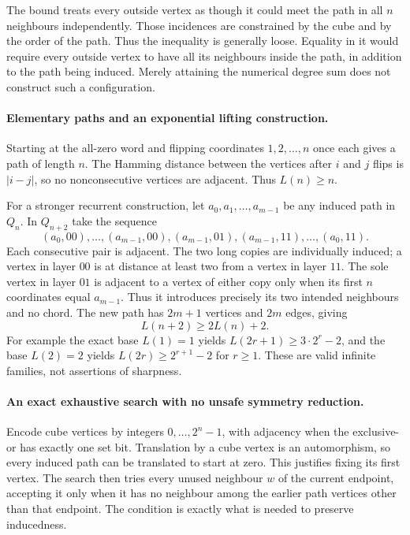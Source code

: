 \documentclass[11pt,a4paper]{article}
\begin{document}
The bound treats every outside vertex as though it could meet the path
in all $n$ neighbours independently. Those incidences are constrained
by the cube and by the order of the path. Thus the inequality is
generally loose. Equality in it would require every outside vertex
to have all its neighbours inside the path, in addition to the path
being induced. Merely attaining the numerical degree sum does not
construct such a configuration.

\paragraph{Elementary paths and an exponential lifting construction.}
Starting at the all-zero word and flipping coordinates $1,2,\ldots,n$
once each gives a path of length $n$. The Hamming distance between
the vertices after $i$ and $j$ flips is $|i-j|$, so no nonconsecutive
vertices are adjacent. Thus $L(n)\ge n$.

For a stronger recurrent construction, let
$a_0,a_1,\ldots,a_{m-1}$ be any induced path in $Q_n$. In $Q_{n+2}$
take the sequence
\[
 (a_0,00),\ldots,(a_{m-1},00),
 (a_{m-1},01),
 (a_{m-1},11),\ldots,(a_0,11).
\]
Each consecutive pair is adjacent. The two long copies are individually
induced; a vertex in layer $00$ is at distance at least two from a
vertex in layer $11$. The sole vertex in layer $01$ is adjacent to
a vertex of either copy only when its first $n$ coordinates equal
$a_{m-1}$. Thus it introduces precisely its two intended neighbours
and no chord. The new path has $2m+1$ vertices and $2m$ edges, giving
\[
                         L(n+2)\ge2L(n)+2.
\]
For example the exact base $L(1)=1$ yields $L(2r+1)\ge3\cdot2^r-2$,
and the base $L(2)=2$ yields $L(2r)\ge2^{r+1}-2$ for $r\ge1$.
These are valid infinite families, not assertions of sharpness.

\paragraph{An exact exhaustive search with no unsafe symmetry reduction.}
Encode cube vertices by integers $0,\ldots,2^n-1$, with adjacency
when the exclusive-or has exactly one set bit. Translation by a cube
vertex is an automorphism, so every induced path can be translated to
start at zero. This justifies fixing its first vertex. The search then
tries every unused neighbour $w$ of the current endpoint, accepting it
only when it has no neighbour among the earlier path vertices other
than that endpoint. The condition is exactly what is needed to preserve
inducedness.
\end{document}
